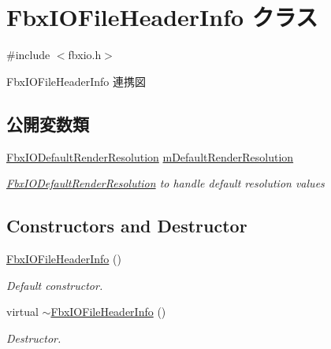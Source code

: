 \hypertarget{class_fbx_i_o_file_header_info}{}\section{Fbx\+I\+O\+File\+Header\+Info クラス}
\label{class_fbx_i_o_file_header_info}


{\ttfamily \#include $<$fbxio.\+h$>$}



Fbx\+I\+O\+File\+Header\+Info 連携図
\subsection*{公開変数類}
\begin{DoxyCompactItemize}
\item 
\hyperlink{class_fbx_i_o_default_render_resolution}{Fbx\+I\+O\+Default\+Render\+Resolution} \hyperlink{class_fbx_i_o_file_header_info_a996d676f069d3d35ca2c68d8b77f5273}{m\+Default\+Render\+Resolution}
\begin{DoxyCompactList}\small\item\em \hyperlink{class_fbx_i_o_default_render_resolution}{Fbx\+I\+O\+Default\+Render\+Resolution} to handle default resolution values \end{DoxyCompactList}\end{DoxyCompactItemize}
\subsection*{Constructors and Destructor}
\begin{DoxyCompactItemize}
\item 
\hyperlink{class_fbx_i_o_file_header_info_ad7f29ce7d02e6f796c7aa813caee7a11}{Fbx\+I\+O\+File\+Header\+Info} ()
\begin{DoxyCompactList}\small\item\em Default constructor. \end{DoxyCompactList}\item 
virtual \hyperlink{class_fbx_i_o_file_header_info_af30c4a1aaae40af02a7518cadb9253f9}{$\sim$\+Fbx\+I\+O\+File\+Header\+Info} ()
\begin{DoxyCompactList}\small\item\em Destructor. \end{DoxyCompactList}\end{DoxyCompactItemize}
